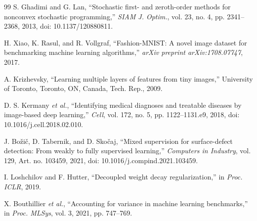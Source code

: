 \documentclass[lettersize,journal]{IEEEtran}
\begin{document}
\begin{thebibliography}{99}
S. Ghadimi and G. Lan, ``Stochastic first- and zeroth-order methods for nonconvex stochastic programming,'' \emph{SIAM J. Optim.}, vol. 23, no. 4, pp. 2341--2368, 2013, doi: 10.1137/120880811.

H. Xiao, K. Rasul, and R. Vollgraf, ``Fashion-MNIST: A novel image dataset for benchmarking machine learning algorithms,'' \emph{arXiv preprint arXiv:1708.07747}, 2017.

A. Krizhevsky, ``Learning multiple layers of features from tiny images,'' University of Toronto, Toronto, ON, Canada, Tech. Rep., 2009.

D. S. Kermany \emph{et al.}, ``Identifying medical diagnoses and treatable diseases by image-based deep learning,'' \emph{Cell}, vol. 172, no. 5, pp. 1122--1131.e9, 2018, doi: 10.1016/j.cell.2018.02.010.

J. Bo\v{z}i\v{c}, D. Tabernik, and D. Sko\v{c}aj, ``Mixed supervision for surface-defect detection: From weakly to fully supervised learning,'' \emph{Computers in Industry}, vol. 129, Art. no. 103459, 2021, doi: 10.1016/j.compind.2021.103459.

I. Loshchilov and F. Hutter, ``Decoupled weight decay regularization,'' in \emph{Proc. ICLR}, 2019.

X. Bouthillier \emph{et al.}, ``Accounting for variance in machine learning benchmarks,'' in \emph{Proc. MLSys}, vol. 3, 2021, pp. 747--769.
\end{thebibliography}
\end{document}
